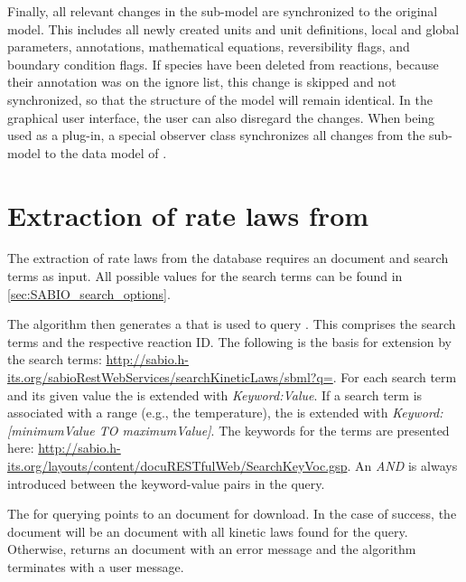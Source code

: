 Finally, all relevant changes in the sub-model are synchronized to the original model.
This includes all newly created units and unit definitions, local and global parameters, annotations, mathematical equations, reversibility flags, and boundary condition flags.
If species have been deleted from reactions, because their \MIRIAM annotation was on the ignore list, this change is skipped and not synchronized, so that the structure of the model will remain identical.
In the graphical user interface, the user can also disregard the changes.
When being used as a \CellDesigner plug-in, a special observer class synchronizes all changes from the sub-model to the data model of \CellDesigner.

\section{Extraction of rate laws from \SABIO}

The extraction of rate laws from the database \SABIO requires an \SBML document and search terms as input.
All possible values for the search terms can be found in \cref{sec:SABIO_search_options}.

The algorithm then generates a \URL that is used to query \SABIO.
This \URL comprises the search terms and the respective \KEGG reaction \ac{ID}. 
The following \URL is the basis for extension by the search terms: \url{http://sabio.h-its.org/sabioRestWebServices/searchKineticLaws/sbml?q=}.
For each search term and its given value the \URL is extended with \emph{Keyword:Value}.
If a search term is associated with a range (e.g., the temperature), the \URL is extended with \emph{Keyword:[minimumValue TO maximumValue]}.
The keywords for the terms are presented here: \url{http://sabio.h-its.org/layouts/content/docuRESTfulWeb/SearchKeyVoc.gsp}.
An \emph{AND} is always introduced between the keyword-value pairs in the query. 

The \URL for querying points to an \XML document for download.
In the case of success, the \XML document will be an \SBML document with all kinetic laws found for the query.
Otherwise, \SABIO returns an \XML document with an error message and the algorithm terminates with a user message.

